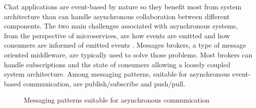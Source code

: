 Chat applications are event-based by nature so they benefit most from system architecture than can handle asynchronous collaboration between different components. The two main challenges associated with asynchronous systems, from the perspective of microservices, are how events are emitted and how consumers are informed of emitted events \cite{newman2015building}. Messages brokers, a type of message oriented middleware, are typically used to solve those problems. Most brokers can handle subscriptions and the state of consumers allowing a loosely coupled system architecture. Among messaging patterns, suitable for asynchronous event-based communication, are publish/subscribe and push/pull.
\\
\begin{figure}[h!]
	\centering
	 \hfill
	\caption{Messaging patterns suitable for asynchronous communication \cite{hintjens2010zeromq}}
\end{figure}

